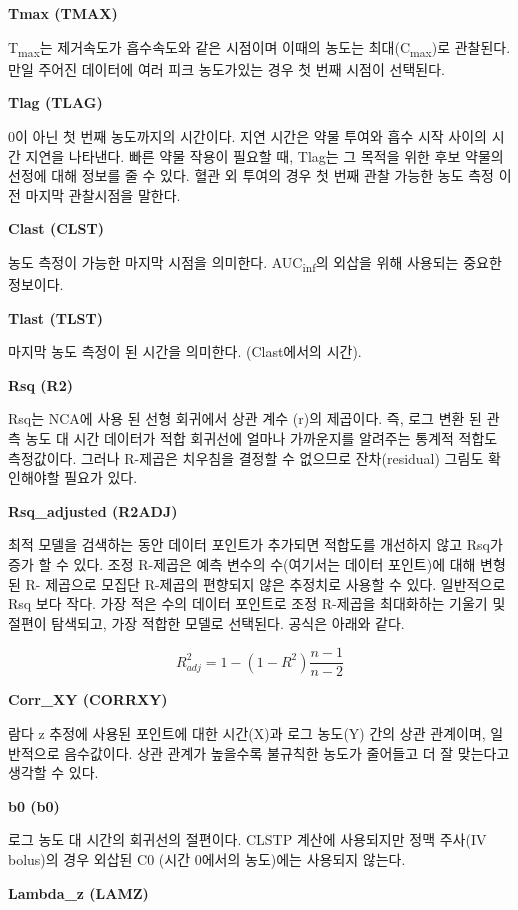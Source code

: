 \documentclass[
  11pt,
  krantz2, a4paper, twoside]{krantz}
\theoremstyle{definition}
\theoremstyle{definition}
\theoremstyle{definition}
\theoremstyle{definition}
\theoremstyle{remark}
\begin{document}
\textbf{Tmax (TMAX)}

T\textsubscript{max}는 제거속도가 흡수속도와 같은 시점이며 이때의 농도는 최대(C\textsubscript{max})로 관찰된다. 만일 주어진 데이터에 여러 피크 농도가있는 경우 첫 번째 시점이 선택된다.

\textbf{Tlag (TLAG)}

0이 아닌 첫 번째 농도까지의 시간이다. 지연 시간은 약물 투여와 흡수 시작 사이의 시간 지연을 나타낸다. 빠른 약물 작용이 필요할 때, Tlag는 그 목적을 위한 후보 약물의 선정에 대해 정보를 줄 수 있다. 혈관 외 투여의 경우 첫 번째 관찰 가능한 농도 측정 이전 마지막 관찰시점을 말한다.

\textbf{Clast (CLST)}

농도 측정이 가능한 마지막 시점을 의미한다. AUC\textsubscript{inf}의 외삽을 위해 사용되는 중요한 정보이다.

\textbf{Tlast (TLST)}

마지막 농도 측정이 된 시간을 의미한다. (Clast에서의 시간).

\textbf{Rsq (R2)}

Rsq는 NCA에 사용 된 선형 회귀에서 상관 계수 (r)의 제곱이다. 즉, 로그 변환 된 관측 농도 대 시간 데이터가 적합 회귀선에 얼마나 가까운지를 알려주는 통계적 적합도 측정값이다. 그러나 R-제곱은 치우침을 결정할 수 없으므로 잔차(residual) 그림도 확인해야할 필요가 있다.

\textbf{Rsq\_adjusted (R2ADJ)}

최적 모델을 검색하는 동안 데이터 포인트가 추가되면 적합도를 개선하지 않고 Rsq가 증가 할 수 있다. 조정 R-제곱은 예측 변수의 수(여기서는 데이터 포인트)에 대해 변형된 R- 제곱으로 모집단 R-제곱의 편향되지 않은 추정치로 사용할 수 있다. 일반적으로 Rsq 보다 작다. 가장 적은 수의 데이터 포인트로 조정 R-제곱을 최대화하는 기울기 및 절편이 탐색되고, 가장 적합한 모델로 선택된다. 공식은 아래와 같다.

\[R_{adj}^{2} = 1 - (1 - R^{2})\frac{n - 1}{n - 2}\]

\textbf{Corr\_XY (CORRXY)}

람다 z 추정에 사용된 포인트에 대한 시간(X)과 로그 농도(Y) 간의 상관 관계이며, 일반적으로 음수값이다. 상관 관계가 높을수록 불규칙한 농도가 줄어들고 더 잘 맞는다고 생각할 수 있다.

\textbf{b0 (b0)}

로그 농도 대 시간의 회귀선의 절편이다. CLSTP 계산에 사용되지만 정맥 주사(IV bolus)의 경우 외삽된 C0 (시간 0에서의 농도)에는 사용되지 않는다.

\textbf{Lambda\_z (LAMZ)}
\end{document}
